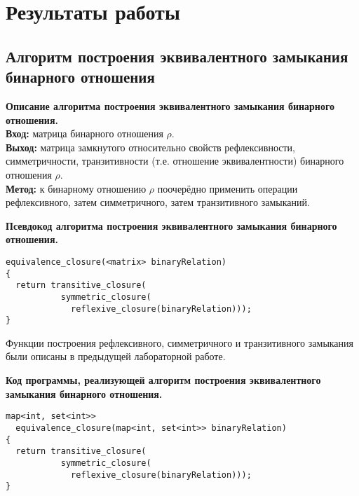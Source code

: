 \documentclass[spec, och, otchet, hidelinks]{SCWorks}
\begin{document}
\newpage

\section{Результаты работы} 

\subsection{Алгоритм построения эквивалентного замыкания бинарного отношения}

\par \textbf{Описание алгоритма построения эквивалентного замыкания бинарного
  отношения.} \\
\textbf{Вход:} матрица бинарного отношения $\rho$. \\
\textbf{Выход:} матрица замкнутого относительно свойств рефлексивности, симметричности,
транзитивности (т.е. отношение эквивалентности) бинарного отношения $\rho$. \\
\textbf{Метод:} к бинарному отношению $\rho$ поочерёдно применить операции
рефлексивного, затем симметричного, затем транзитивного замыканий. \\

\par \textbf{Псевдокод алгоритма построения эквивалентного замыкания бинарного
  отношения.}

\begin{lstlisting}[caption=Псевдокод алгоритма., mathescape]
equivalence_closure(<matrix> binaryRelation)
{
  return transitive_closure(
           symmetric_closure(
             reflexive_closure(binaryRelation)));
}
\end{lstlisting}

Функции построения рефлексивного, симметричного и транзитивного замыкания были
описаны в предыдущей лабораторной работе. \\

\par \textbf{Код программы, реализующей алгоритм построения эквивалентного
  замыкания бинарного отношения.}

\begin{lstlisting}[caption=Код программы., mathescape]
map<int, set<int>>
  equivalence_closure(map<int, set<int>> binaryRelation)
{
  return transitive_closure(
           symmetric_closure(
             reflexive_closure(binaryRelation)));
}
\end{lstlisting}

\newpage
\end{document}
